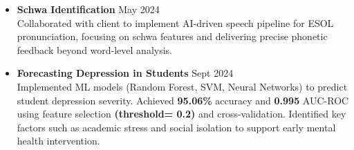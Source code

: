 \documentclass[10 pt, letterpaper]{article}
\begin{document}
\begin{itemize}
 \vspace{-0.23cm}
    \item \textbf{Schwa Identification}\hfill{ May 2024}\\ Collaborated with client to implement AI-driven speech pipeline for ESOL pronunciation, focusing on schwa features and delivering precise phonetic feedback beyond word-level analysis.
    \vspace{-0.23cm}
    \item \textbf{Forecasting Depression in Students}\hfill{ Sept 2024}\\ Implemented ML models (Random Forest, SVM, Neural Networks) to predict student depression severity. Achieved \textbf{95.06\%} accuracy and \textbf{0.995 }AUC-ROC using feature selection \textbf{(threshold= 0.2)} and cross-validation. Identified key factors such as academic stress and social isolation to support early mental health intervention.
    \vspace{-0.23cm}
    
\end{itemize}


\vspace{-0.1cm}
\end{document}
